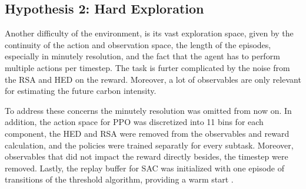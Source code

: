 \subsection{Hypothesis 2: Hard Exploration}
Another difficulty of the environment, is its vast exploration space, given by the continuity of the action and observation space, the length of the episodes, especially in minutely resolution, and the fact that the agent has to perform multiple actions per timestep. The task is furter complicated by the noise from the RSA and HED on the reward. Moreover, a lot of observables are only relevant for estimating the future carbon intensity. 
\par
To address these concerns the minutely resolution was omitted from now on. In addition, the action space for PPO was discretized into 11 bins for each component, the HED and RSA were removed from the observables and reward calculation, and the policies were trained separatly for every subtask. Moreover, observables that did not impact the reward directly besides, the timestep were removed. Lastly, the replay buffer for SAC was initialized with one episode of transitions of the threshold algorithm, providing a warm start \cite{Wang.20.06.2023}.

